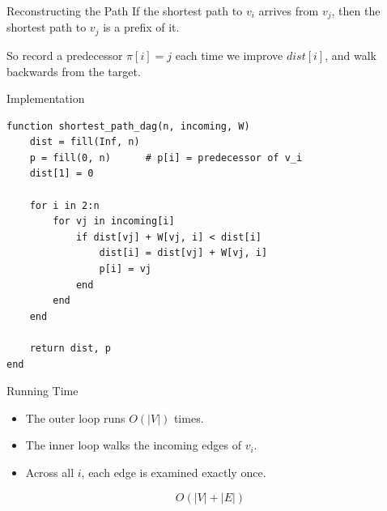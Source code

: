 \documentclass[10pt,aspectratio=169]{beamer}
\begin{document}
\begin{frame}{Reconstructing the Path}
  If the shortest path to $v_i$ arrives from $v_j$, then the shortest path to
  $v_j$ is a \alert{prefix} of it.

  \bigskip
  So record a predecessor $\pi[i] = j$ each time we improve $dist[i]$, and walk
  backwards from the target.

  \bigskip
  \begin{center}
  \end{center}
\end{frame}

\begin{frame}[fragile]{Implementation}
  \begin{lstlisting}
function shortest_path_dag(n, incoming, W)
    dist = fill(Inf, n)
    p = fill(0, n)      # p[i] = predecessor of v_i
    dist[1] = 0

    for i in 2:n
        for vj in incoming[i]
            if dist[vj] + W[vj, i] < dist[i]
                dist[i] = dist[vj] + W[vj, i]
                p[i] = vj
            end
        end
    end

    return dist, p
end
  \end{lstlisting}
\end{frame}

\begin{frame}{Running Time}
  \begin{itemize}
    \item The outer loop runs $O(|V|)$ times.
    \item The inner loop walks the incoming edges of $v_i$.
    \item Across all $i$, each edge is examined \alert{exactly once}.
  \end{itemize}

  \bigskip
  \begin{alertblock}{}
    \[
      O(|V| + |E|)
    \]
  \end{alertblock}
\end{frame}
\end{document}
